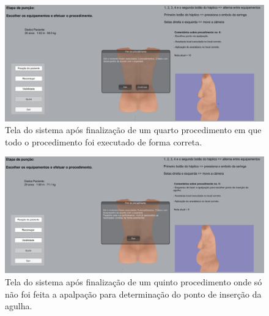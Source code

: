 \begin{figure}[ht!]
    \centering
    \includegraphics[width=\textwidth]{capitulos/figuras/sistema-exemplo-execucao-procedimento-4.png} 
    \caption{Tela do sistema após finalização de um quarto procedimento em que todo o procedimento foi executado de forma correta.}
    \label{fig:sistemaExecucao4correto}
\end{figure}

\begin{figure}[ht!]
    \centering
    \includegraphics[width=\textwidth]{capitulos/figuras/sistema-exemplo-execucao-procedimento-5.png} 
    \caption{Tela do sistema após finalização de um quinto procedimento onde só não foi feita a apalpação para determinação do ponto de inserção da agulha.}
    \label{fig:sistemaExecucao5semApalpacaoCorreto}
\end{figure}

